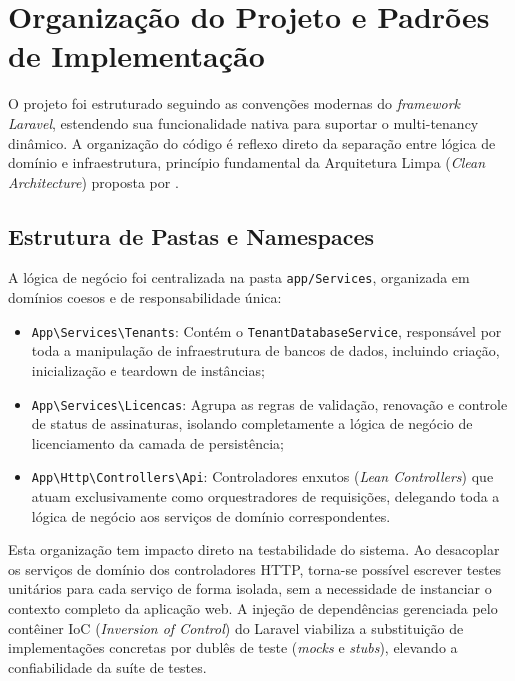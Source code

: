 \section{Organização do Projeto e Padrões de Implementação}

O projeto foi estruturado seguindo as convenções modernas do \textit{framework
Laravel}, estendendo sua funcionalidade nativa para suportar o multi-tenancy
dinâmico. A organização do código é reflexo direto da separação entre lógica
de domínio e infraestrutura, princípio fundamental da Arquitetura Limpa
(\textit{Clean Architecture}) proposta por .

\subsection{Estrutura de Pastas e Namespaces}

A lógica de negócio foi centralizada na pasta \texttt{app/Services}, organizada
em domínios coesos e de responsabilidade única:

\begin{itemize}
    \item \texttt{App\textbackslash{}Services\textbackslash{}Tenants}: Contém o
    \texttt{TenantDatabaseService}, responsável por toda a manipulação de
    infraestrutura de bancos de dados, incluindo criação, inicialização e
    teardown de instâncias;

    \item \texttt{App\textbackslash{}Services\textbackslash{}Licencas}: Agrupa
    as regras de validação, renovação e controle de status de assinaturas,
    isolando completamente a lógica de negócio de licenciamento da camada de
    persistência;

    \item \texttt{App\textbackslash{}Http\textbackslash{}Controllers\textbackslash{}Api}:
    Controladores enxutos (\textit{Lean Controllers}) que atuam exclusivamente
    como orquestradores de requisições, delegando toda a lógica de negócio aos
    serviços de domínio correspondentes.
\end{itemize}

Esta organização tem impacto direto na testabilidade do sistema. Ao desacoplar
os serviços de domínio dos controladores HTTP, torna-se possível escrever testes
unitários para cada serviço de forma isolada, sem a necessidade de instanciar
o contexto completo da aplicação web. A injeção de dependências gerenciada pelo
contêiner IoC (\textit{Inversion of Control}) do Laravel viabiliza a
substituição de implementações concretas por dublês de teste (\textit{mocks} e
\textit{stubs}), elevando a confiabilidade da suíte de testes.

